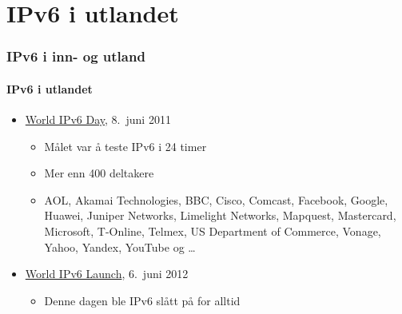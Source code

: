 \section{IPv6 i utlandet}
\begin{frame}
  \frametitle{IPv6 i inn- og utland}
  \framesubtitle{IPv6 i utlandet}
  \begin{itemize}
  \item
    \href{http://www.internetsociety.org/ipv6/archive-2011-world-ipv6-day/}{World
      IPv6 Day}, 8.\ juni 2011
    \begin{itemize}
    \item Målet var å teste IPv6 i 24 timer
    \item Mer enn 400 deltakere
    \item AOL, Akamai Technologies, BBC, Cisco, Comcast, Facebook,
      Google, Huawei, Juniper Networks, Limelight Networks, Mapquest,
      Mastercard, Microsoft, T-Online, Telmex, US Department of
      Commerce, Vonage, Yahoo, Yandex, YouTube og \dots
    \end{itemize}
  \item \href{http://www.worldipv6launch.org/}{World IPv6 Launch},
    6.\ juni 2012
    \begin{itemize}
    \item Denne dagen ble IPv6 slått på for alltid
    \end{itemize}
  \end{itemize}
\end{frame}

